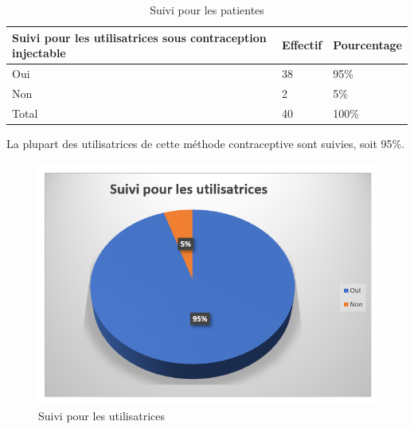 \begin{table}[H]
  \centering
  \renewcommand{\arraystretch}{1.5}
  \caption{Suivi pour les patientes}
  \begin{spacing}{1.5} %
  \begin{tabularx}{\textwidth}{|p{8cm}|X|X|}
      \hline
      \rowcolor{customcolor}
      \textbf{\color{white}Suivi pour les utilisatrices \newline sous contraception injectable} & \textbf{\color{white}Effectif} & \textbf{\color{white}Pourcentage}  \\
      \hline
      Oui & 38 & 95\% \\
      \hline
      Non  & 2 & 5\% \\
      \hline
      Total & 40 & 100\% \\
      
      \hline
  \end{tabularx}
\end{spacing}

\end{table}

\noindent La plupart des utilisatrices de cette méthode contraceptive sont suivies, soit 95\%. 

\begin{figure}[H]
  \centering
  \includegraphics[scale=1.1]{Images/fig_57.png}
  \caption{Suivi pour les utilisatrices}
  
\end{figure}


